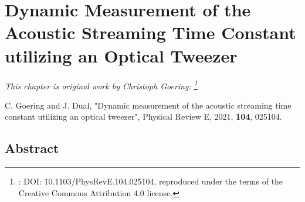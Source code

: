\renewcommand{\relPath}{SECTION/40_Pulsing/}
 
\chapter[Dynamic Timeconstant Measurement]{Dynamic Measurement of the Acoustic 
Streaming Time Constant utilizing an Optical Tweezer}\label{ch:pulsing}
\textit{This chapter is original work by Christoph Goering:
\footnote{: DOI: 10.1103/PhysRevE.104.025104, reproduced under the terms of the 
Creative Commons Attribution 4.0 license.}}

\vspace{5mm} \noindent
C. Goering and J. Dual, "Dynamic measurement of the acoustic streaming time 
constant utilizing an optical tweezer", Physical Review E, 2021, \textbf{104}, 
025104.


\section{Abstract}
